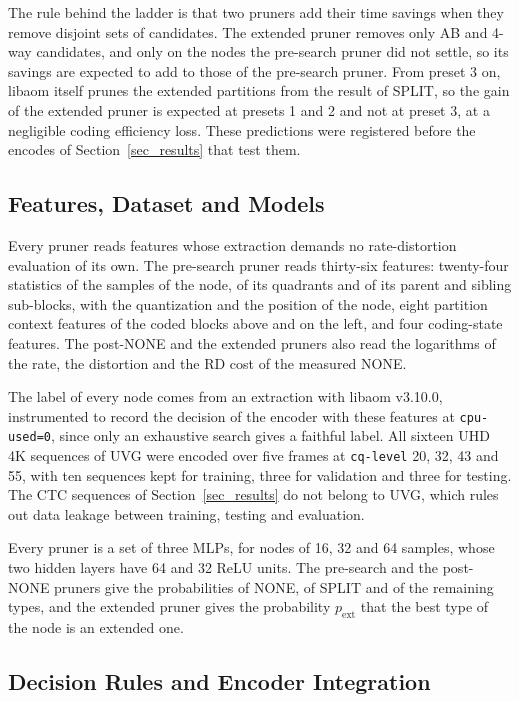 \documentclass[conference]{IEEEtran}
\begin{document}
The rule behind the ladder is that two pruners add their time savings when they
remove disjoint sets of candidates. The extended pruner removes only AB and
4-way candidates, and only on the nodes the pre-search pruner did not settle, so
its savings are expected to add to those of the pre-search pruner. From preset 3
on, libaom itself prunes the extended partitions from the result of SPLIT, so
the gain of the extended pruner is expected at presets 1 and 2 and not at
preset 3, at a negligible coding efficiency loss. These predictions were registered before the
encodes of Section~\ref{sec_results} that test them.

\subsection{Features, Dataset and Models}
\label{sec_models}

Every pruner reads features whose extraction demands no rate-distortion
evaluation of its own. The pre-search pruner reads thirty-six features: twenty-four
statistics of the samples of the node, of its quadrants and of its parent and
sibling sub-blocks, with the quantization and the position of the node, eight
partition context features of the coded blocks above and on the left, and four
coding-state features. The post-NONE and the extended pruners also read the logarithms of the rate, the
distortion and the RD cost of the measured NONE.

The label of every node comes from an extraction with libaom v3.10.0,
instrumented to record the decision of the encoder with these features at
\texttt{cpu-used=0}, since only an exhaustive search gives a faithful label. All
sixteen UHD 4K sequences of UVG \cite{uvg} were encoded over five frames at
\texttt{cq-level} 20, 32, 43 and 55, with ten sequences kept for training, three
for validation and three for testing. The CTC sequences of
Section~\ref{sec_results} do not belong to UVG, which rules out data leakage
between training, testing and evaluation.

Every pruner is a set of three MLPs, for nodes of 16, 32 and 64 samples, whose
two hidden layers have 64 and 32 ReLU units. The pre-search and the post-NONE
pruners give the probabilities of NONE, of SPLIT and of the remaining types, and
the extended pruner gives the probability $p_{\mathrm{ext}}$ that the best type
of the node is an extended one.

\subsection{Decision Rules and Encoder Integration}
\label{sec_policy}
\end{document}
